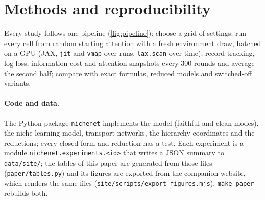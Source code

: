 \section{Methods and reproducibility}\label{app:methods}

Every study follows one pipeline (\cref{fig:pipeline}): choose a grid of settings; run every cell from random starting
attention with a fresh environment draw, batched on a GPU (JAX, \texttt{jit} and \texttt{vmap} over runs,
\texttt{lax.scan} over time); record tracking, log-loss, information cost and attention snapshots every 300 rounds and
average the second half; compare with exact formulas, reduced models and switched-off variants.


\paragraph{Code and data.} The Python package \texttt{nichenet} implements the model (faithful and clean modes), the
niche-learning model, transport networks, the hierarchy coordinates and the reductions; every closed form and reduction
has a test. Each experiment is a module \texttt{nichenet.experiments.<id>} that writes a JSON summary to
\texttt{data/site/}; the tables of this paper are generated from those files (\texttt{paper/tables.py}) and its figures
are exported from the companion website, which renders the same files (\texttt{site/scripts/export-figures.mjs}).
\texttt{make paper} rebuilds both.

